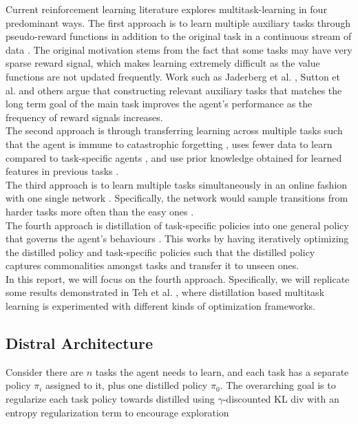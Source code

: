 \documentclass[12pt]{report}
\begin{document}
Current reinforcement learning literature explores multitask-learning in four predominant ways. The first approach is to learn multiple auxiliary tasks through pseudo-reward functions in addition to the original task in a continuous stream of data \cite{jaderberg2016reinforcement} \cite{hessel2019multi}. The original motivation stems from the fact that some tasks may have very sparse reward signal, which makes learning extremely difficult as the value functions are not updated frequently. Work such as Jaderberg et al. \cite{jaderberg2016reinforcement}, Sutton et al. \cite{sutton2011horde} and others \cite{lample2017playing} \cite{schaul2015universal} argue that constructing relevant auxiliary tasks that matches the long term goal of the main task improves the agent's performance as the frequency of reward signals increases.\\

The second approach is through transferring learning across multiple tasks such that the agent is immune to catastrophic forgetting \cite{rusu2016progressive}, uses fewer data to learn compared to task-specific agents \cite{mitchell1993explanation}, and use prior knowledge obtained for learned features in previous tasks \cite{rusu2016progressive}.\\

The third approach is to learn multiple tasks simultaneously in an online fashion with one single network \cite{hessel2019multi}. Specifically, the network would sample transitions from harder tasks more often than the easy ones \cite{sharma2017learning}.\\

The fourth approach is distillation of task-specific policies into one general policy that governs the agent's behaviours \cite{teh2017distral} \cite{schmitt2018kickstarting} \cite{parisotto2015actor}. This works by having iteratively optimizing the distilled policy and task-specific policies such that the distilled policy captures commonalities amongst tasks and transfer it to unseen ones.\\

In this report, we will focus on the fourth approach. Specifically, we will replicate some results demonstrated in Teh et al. \cite{teh2017distral}, where distillation based multitask learning is experimented with different kinds of optimization frameworks. 

\subsection{Distral Architecture}
Consider there are $n$ tasks the agent needs to learn, and each task has a separate policy $\pi_i$ assigned to it, plus one distilled policy $\pi_0$. The overarching goal is to regularize each task policy towards distilled using $\gamma$-discounted KL div with an entropy regularization term to encourage exploration
\end{document}

